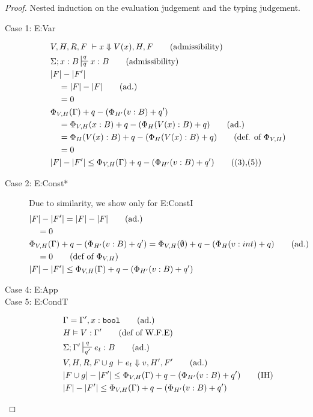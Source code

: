 \documentclass[sigconf]{acmart}
\newcommand{\irl}[1]{\mathtt{#1}}
\theoremstyle{definition}
\begin{document}
\begin{proof}
Nested induction on the evaluation judgement and the typing judgement.\\
\begin{description}
  \item[Case 1: E:Var]
  \begin{align}
  &V,H,R,F \; \vdash x \Downarrow V(x),H,F \tag{admissibility}\\
  &\Sigma; x : B \sststile{q}{q} x : B \tag{admissibility}\\
  &|F| - |F'|\\
  &\quad = |F| - |F| \tag{ad.}\\
  &\quad = 0\\
  &\Phi_{V,H}(\Gamma) + q - (\Phi_{H'}(v:B) + q')\\
  &\quad = \Phi_{V,H}(x : B) + q - (\Phi_{H}(V(x) : B) + q) \tag{ad.}\\
  &\quad = \Phi_{H}(V(x) : B) + q  - (\Phi_{H}(V(x) : B) + q) \tag{def. of $\Phi_{V,H}$}\\
  &\quad = 0\\
  &|F| - |F'| \le \Phi_{V,H}(\Gamma) +q - (\Phi_{H'}(v:B) + q') \tag{(3),(5)}
  \end{align}
  \item[Case 2: E:Const*]
  Due to similarity, we show only for E:ConstI
  \begin{align*}
  &|F| - |F'| = |F| - |F| \tag{ad.}\\
  &\quad = 0\\
  &\Phi_{V,H}(\Gamma) +q - (\Phi_{H'}(v:B) + q') = \Phi_{V,H}(\emptyset) +q - (\Phi_{H}(v:int) + q) \tag{ad.}\\
  &\quad = 0 \tag{def of $\Phi_{V,H}$}\\
  &|F| - |F'| \le \Phi_{V,H}(\Gamma) +q - (\Phi_{H'}(v:B) + q')
  \end{align*}
  \item[Case 4: E:App]
  \item[Case 5: E:CondT]
  \begin{align*}
  &\Gamma = \Gamma', x : \irl{bool} \tag{ad.}\\
  &H \vDash V : \Gamma' \tag{def of W.F.E}\\
  &\Sigma; \Gamma' \sststile{q'}{q} e_t : B \tag{ad.}\\
  &V,H,R,F \cup g\; \vdash e_t \Downarrow v, H',F' \tag{ad.}\\
  &|F \cup g| - |F'| \le \Phi_{V,H}(\Gamma) +q - (\Phi_{H'}(v:B) + q') \tag{IH}\\
  &|F| - |F'| \le \Phi_{V,H}(\Gamma) +q - (\Phi_{H'}(v:B) + q') \\

\end{align*}
\end{description}
\end{proof}
\end{document}
